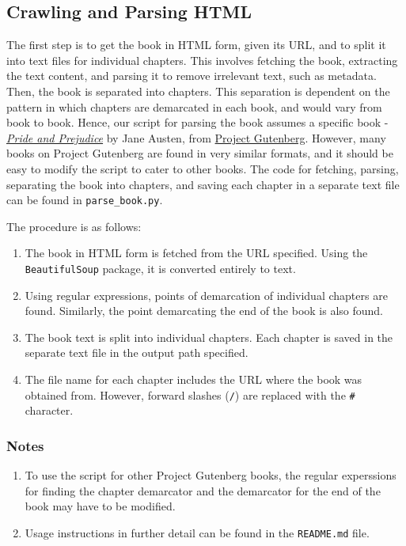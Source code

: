 \documentclass{article}
\begin{document}
\subsection{Crawling and Parsing HTML}
\begin{flushleft}
The first step is to get the book in HTML form, given its URL, and to split it into text files for individual chapters. This involves fetching the book, extracting the text content, and parsing it to remove irrelevant text, such as metadata. Then, the book is separated into chapters. This separation is dependent on the pattern in which chapters are demarcated in each book, and would vary from book to book. Hence, our script for parsing the book assumes a specific book - \textit{\href{https://www.gutenberg.org/files/1342/1342-h/1342-h.htm}{Pride and Prejudice}} by Jane Austen, from \href{https://www.gutenberg.org}{Project Gutenberg}. However, many books on Project Gutenberg are found in very similar formats, and it should be easy to modify the script to cater to other books. The code for fetching, parsing, separating the book into chapters, and saving each chapter in a separate text file can be found in \verb|parse_book.py|.

The procedure is as follows:
\begin{enumerate}
\item The book in HTML form is fetched from the URL specified. Using the \verb|BeautifulSoup| package, it is converted entirely to text.
\item Using regular expressions, points of demarcation of individual chapters are found. Similarly, the point demarcating the end of the book is also found.
\item The book text is split into individual chapters. Each chapter is saved in the separate text file in the output path specified.
\item The file name for each chapter includes the URL where the book was obtained from. However, forward slashes (\verb|/|) are replaced with the \verb|#| character.
\end{enumerate}

\subsubsection*{Notes}
\begin{enumerate}
\item To use the script for other Project Gutenberg books, the regular experssions for finding the chapter demarcator and the demarcator for the end of the book may have to be modified.
\item Usage instructions in further detail can be found in the \verb|README.md| file.
\end{enumerate}
\end{flushleft}
\newpage
\end{document}
